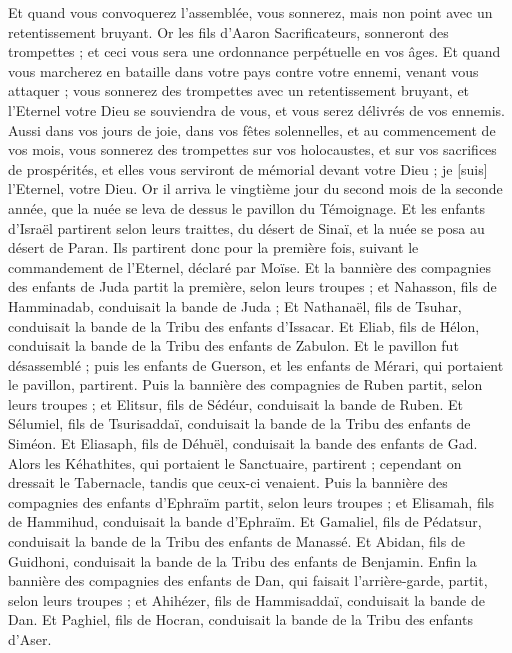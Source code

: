 \begin{multicols}{2}
Et quand vous convoquerez l'assemblée, vous sonnerez, mais non point avec un retentissement bruyant.
Or les fils d'Aaron Sacrificateurs, sonneront des trompettes ; et ceci vous sera une ordonnance perpétuelle en vos âges.
Et quand vous marcherez en bataille dans votre pays contre votre ennemi, venant vous attaquer ; vous sonnerez des trompettes avec un retentissement bruyant, et l'Eternel votre Dieu se souviendra de vous, et vous serez délivrés de vos ennemis.
Aussi dans vos jours de joie, dans vos fêtes solennelles, et au commencement de vos mois, vous sonnerez des trompettes sur vos holocaustes, et sur vos sacrifices de prospérités, et elles vous serviront de mémorial devant votre Dieu ; je [suis] l'Eternel, votre Dieu.
Or il arriva le vingtième jour du second mois de la seconde année, que la nuée se leva de dessus le pavillon du Témoignage.
Et les enfants d'Israël partirent selon leurs traittes, du désert de Sinaï, et la nuée se posa au désert de Paran.
Ils partirent donc pour la première fois, suivant le commandement de l'Eternel, déclaré par Moïse.
Et la bannière des compagnies des enfants de Juda partit la première, selon leurs troupes ; et Nahasson, fils de Hamminadab, conduisait la bande de Juda ;
Et Nathanaël, fils de Tsuhar, conduisait la bande de la Tribu des enfants d'Issacar.
Et Eliab, fils de Hélon, conduisait la bande de la Tribu des enfants de Zabulon.
Et le pavillon fut désassemblé ; puis les enfants de Guerson, et les enfants de Mérari, qui portaient le pavillon, partirent.
Puis la bannière des compagnies de Ruben partit, selon leurs troupes ; et Elitsur, fils de Sédéur, conduisait la bande de Ruben.
Et Sélumiel, fils de Tsurisaddaï, conduisait la bande de la Tribu des enfants de Siméon.
Et Eliasaph, fils de Déhuël, conduisait la bande des enfants de Gad.
Alors les Kéhathites, qui portaient le Sanctuaire, partirent ; cependant on dressait le Tabernacle, tandis que ceux-ci venaient.
Puis la bannière des compagnies des enfants d'Ephraïm partit, selon leurs troupes ; et Elisamah, fils de Hammihud, conduisait la bande d'Ephraïm.
Et Gamaliel, fils de Pédatsur, conduisait la bande de la Tribu des enfants de Manassé.
Et Abidan, fils de Guidhoni, conduisait la bande de la Tribu des enfants de Benjamin.
Enfin la bannière des compagnies des enfants de Dan, qui faisait l'arrière-garde, partit, selon leurs troupes ; et Ahihézer, fils de Hammisaddaï, conduisait la bande de Dan.
Et Paghiel, fils de Hocran, conduisait la bande de la Tribu des enfants d'Aser.

\end{multicols}
